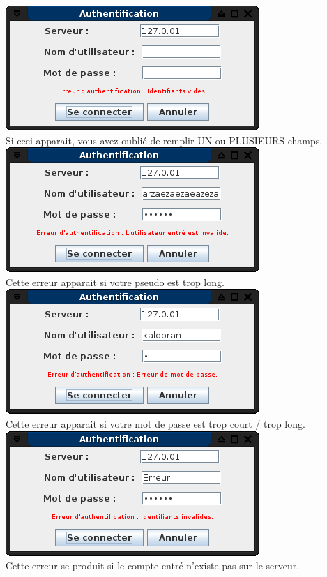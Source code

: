 \documentclass[12pt,a4paper]{article}
\begin{document}
\begin{center}

	\includegraphics[scale=0.5]{images/erreurvide.png} \\
	Si ceci apparait, vous avez oublié de remplir UN ou PLUSIEURS champs. \\

	\includegraphics[scale=0.5]{images/erreurpseudo.png} \\
	Cette erreur apparait si votre pseudo est trop long. \\

	\includegraphics[scale=0.5]{images/erreurpass.png} \\
	Cette erreur apparait si votre mot de passe est trop court / trop long. \\

	\includegraphics[scale=0.5]{images/erreurid.png} \\
	Cette erreur se produit si le compte entré n'existe pas sur le serveur. \\

\end{center}
\end{document}
